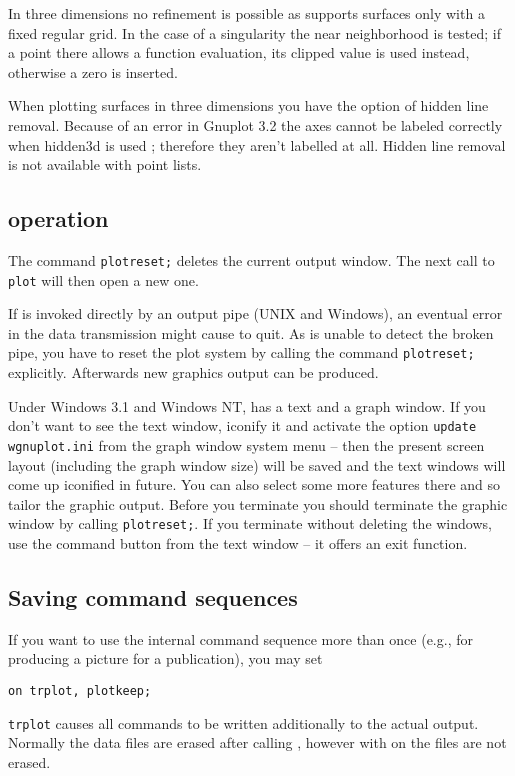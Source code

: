 In three dimensions no refinement is possible as {\Gnuplot} supports surfaces only
with a fixed regular grid. In the case of a singularity the near neighborhood is
tested; if a point there allows a function evaluation, its clipped value is used
instead, otherwise a zero is inserted.

When plotting surfaces in three dimensions you have the option of hidden line
removal. Because of an error in Gnuplot 3.2 the axes cannot be labeled correctly
when hidden3d is used ; therefore they aren't labelled at all.  Hidden line
removal is not available with point lists.


\subsection{{\Gnuplot} operation}
\hypertarget{command:PLOTRESET}{}

The command \texttt{plotreset;} deletes the current {\Gnuplot} output
window. The next call to \texttt{plot} will then open a new one.

If {\Gnuplot} is invoked directly by an output pipe (UNIX and Windows), an eventual
error in the {\Gnuplot} data transmission might cause {\Gnuplot} to quit. As {\REDUCE}
is unable to detect the broken pipe, you have to reset the plot system by
calling the command \texttt{plotreset;} explicitly. Afterwards new graphics
output can be produced.

Under Windows 3.1 and Windows NT, {\Gnuplot} has a text and a graph window.  If you
don't want to see the text window, iconify it and activate the
option \texttt{update wgnuplot.ini} from the graph window system menu -- then the
present screen layout (including the graph window size) will be saved and the
text windows will come up iconified in future.  You can also select some more
features there and so tailor the graphic output.  Before you terminate {\REDUCE}
you should terminate the graphic window by calling \texttt{plotreset;}.  If you
terminate {\REDUCE} without deleting the {\Gnuplot} windows, use the command button
from the {\Gnuplot} text window -- it offers an exit function.


\subsection{Saving {\Gnuplot} command sequences}
\hypertarget{switch:TRPLOT}{}
\hypertarget{switch:PLOTKEEP}{}
If you want to use the internal {\Gnuplot} command sequence more than once
(e.g., for producing a picture for a publication), you may set
\begin{verbatim}
on trplot, plotkeep;
\end{verbatim}
\texttt{trplot} causes all {\Gnuplot} commands to be written additionally to the
actual {\REDUCE} output.  Normally the data files are erased after calling
{\Gnuplot}, however with  on the files are not erased.


